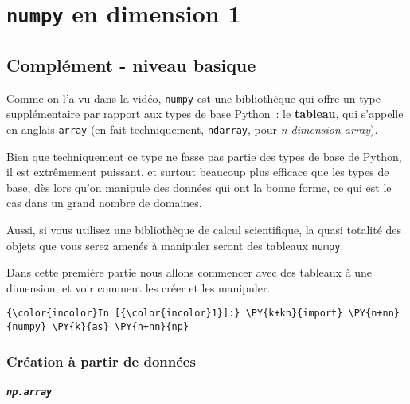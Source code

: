    
    
    
    

    

    \hypertarget{numpy-en-dimension-1}{%
\section{\texorpdfstring{\texttt{numpy} en dimension
1}{numpy en dimension 1}}\label{numpy-en-dimension-1}}

    \hypertarget{compluxe9ment---niveau-basique}{%
\subsection{Complément - niveau
basique}\label{compluxe9ment---niveau-basique}}

    Comme on l'a vu dans la vidéo, \texttt{numpy} est une bibliothèque qui
offre un type supplémentaire par rapport aux types de base Python~: le
\textbf{tableau}, qui s'appelle en anglais \texttt{array} (en fait
techniquement, \texttt{ndarray}, pour \emph{n-dimension array}).

Bien que techniquement ce type ne fasse pas partie des types de base de
Python, il est extrêmement puissant, et surtout beaucoup plus efficace
que les types de base, dès lors qu'on manipule des données qui ont la
bonne forme, ce qui est le cas dans un grand nombre de domaines.

Aussi, si vous utilisez une bibliothèque de calcul scientifique, la
quasi totalité des objets que vous serez amenés à manipuler seront des
tableaux \texttt{numpy}.

    Dans cette première partie nous allons commencer avec des tableaux à une
dimension, et voir comment les créer et les manipuler.

    \begin{Verbatim}[commandchars=\\\{\}]
{\color{incolor}In [{\color{incolor}1}]:} \PY{k+kn}{import} \PY{n+nn}{numpy} \PY{k}{as} \PY{n+nn}{np}
\end{Verbatim}


    \hypertarget{cruxe9ation-uxe0-partir-de-donnuxe9es}{%
\subsubsection{Création à partir de
données}\label{cruxe9ation-uxe0-partir-de-donnuxe9es}}

    \hypertarget{np.array}{%
\subparagraph{\texorpdfstring{\texttt{np.array}}{np.array}}\label{np.array}}

